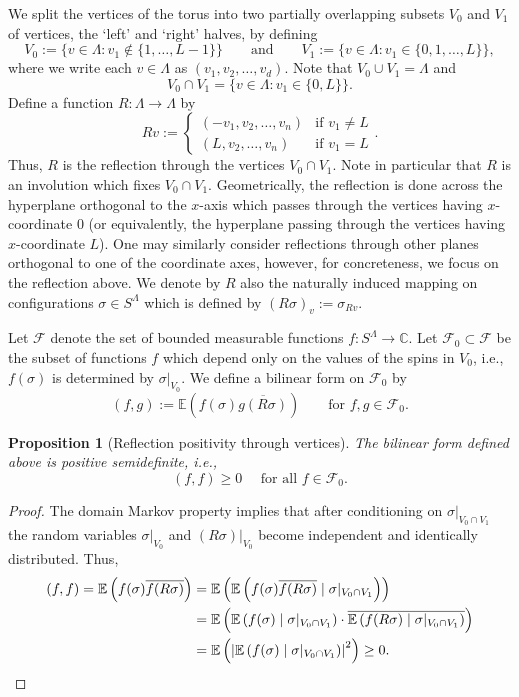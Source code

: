 \documentclass[12pt,reqno]{article}
\def\C{\mathbb{C}}
\def\E{\mathbb{E}}
\newtheorem{proposition}[theorem]{Proposition}
\newcommand{\cF}{\mathcal{F}}
\begin{document}
\medbreak
{}
We split the vertices of the torus into two partially overlapping subsets $V_0$ and $V_1$ of vertices, the `left' and `right' halves, by defining
\[ V_0 := \big\{ v \in \Lambda : v_1 \notin \{1,\dots,L-1 \} \big\} \qquad\text{and}\qquad V_1 := \big\{ v \in \Lambda : v_1 \in \{0,1,\dots,L \} \big\},\]
where we write each $v\in \Lambda$ as $(v_1,v_2,\ldots, v_d)$. Note that $V_0 \cup V_1 = \Lambda$ and
\[ V_0 \cap V_1 = \big\{ v \in \Lambda : v_1 \in \{0,L\} \big\} .\]
Define a function $R \colon \Lambda \to \Lambda$ by
\[ Rv := \begin{cases}
	(-v_1,v_2,\dots,v_n) &\text{if }v_1 \neq L\\
	(L,v_2,\dots,v_n) &\text{if }v_1 = L
\end{cases}.\]
Thus, $R$ is the reflection through the vertices $V_0 \cap V_1$.
Note in particular that $R$ is an involution which fixes $V_0 \cap V_1$.
Geometrically, the reflection is done across the hyperplane
orthogonal to the $x$-axis which passes through the vertices having
$x$-coordinate $0$ (or equivalently, the
hyperplane passing through the vertices having $x$-coordinate $L$). One may similarly consider reflections through other planes orthogonal to one of the coordinate axes, however, for concreteness, we focus on the reflection above. We denote by $R$ also the naturally induced mapping on configurations $\sigma \in S^\Lambda$ which is defined by $(R\sigma)_v := \sigma_{Rv}$.

Let $\cF$ denote the set of bounded measurable functions $f \colon S^\Lambda \to \C$.
Let $\cF_0 \subset \cF$ be the subset of functions $f$ which depend only on the values of the spins in $V_0$, i.e., $f(\sigma)$ is determined by $\sigma|_{V_0}$.
We define a bilinear form on $\cF_0$ by
\[ (f,g) := \E\left(f(\sigma) \overline{g(R\sigma)}\right) \qquad\text{for }f,g \in \cF_0 .\]

\begin{proposition}[Reflection positivity through vertices]
	The bilinear form defined above is positive semidefinite, i.e.,
\begin{equation}\label{eq:reflection_positivity_vertices}
  (f,f) \ge 0\quad\text{ for all $f \in \cF_0$}.
\end{equation}
\end{proposition}
\begin{proof}
	The domain Markov property implies that after conditioning on $\sigma|_{V_0 \cap V_1}$ the random variables $\sigma|_{V_0}$ and $(R\sigma)|_{V_0}$ become independent and identically distributed. Thus,
	\begin{align*}
	(f,f) = \E\left(f(\sigma) \overline{f(R\sigma)}\right)
	 &= \E\left(\E\left(f(\sigma) \overline{f(R\sigma)} \mid \sigma|_{V_0 \cap V_1} \right)\right) \\
	 &= \E\left(\E\left(f(\sigma) \mid \sigma|_{V_0 \cap V_1} \right) \cdot \overline{\E\left(f(R\sigma) \mid \sigma|_{V_0 \cap V_1} \right)} \right) \\
	 &= \E\left(\left|\E\left(f(\sigma) \mid \sigma|_{V_0 \cap V_1} \right)\right|^2  \right) \ge 0 . \qedhere
	\end{align*}
\end{proof}
\end{document}

